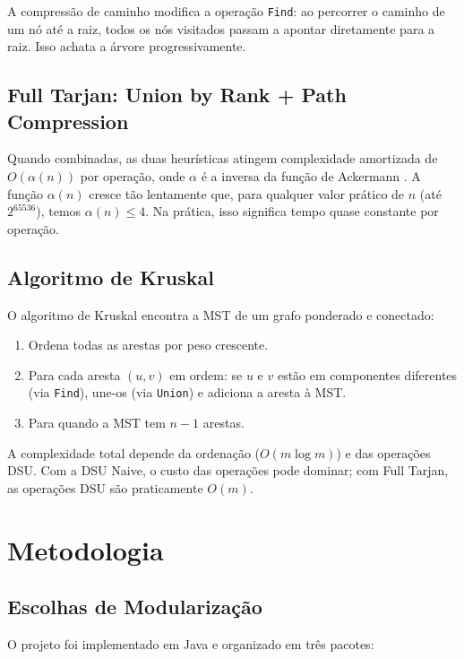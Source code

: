 \documentclass[12pt]{article}
\begin{document}
A compressão de caminho modifica a operação \texttt{Find}: ao percorrer o caminho de um nó até a raiz, todos os nós visitados passam a apontar diretamente para a raiz. Isso achata a árvore progressivamente.

\subsection{Full Tarjan: Union by Rank + Path Compression}

Quando combinadas, as duas heurísticas atingem complexidade amortizada de $O(\alpha(n))$ por operação, onde $\alpha$ é a inversa da função de Ackermann \cite{tarjan1975}. A função $\alpha(n)$ cresce tão lentamente que, para qualquer valor prático de $n$ (até $2^{65536}$), temos $\alpha(n) \leq 4$. Na prática, isso significa tempo quase constante por operação.

\subsection{Algoritmo de Kruskal}

O algoritmo de Kruskal \cite{kruskal1956} encontra a MST de um grafo ponderado e conectado:

\begin{enumerate}
    \item Ordena todas as arestas por peso crescente.
    \item Para cada aresta $(u, v)$ em ordem: se $u$ e $v$ estão em componentes diferentes (via \texttt{Find}), une-os (via \texttt{Union}) e adiciona a aresta à MST.
    \item Para quando a MST tem $n-1$ arestas.
\end{enumerate}

A complexidade total depende da ordenação ($O(m \log m)$) e das operações DSU. Com a DSU Naive, o custo das operações pode dominar; com Full Tarjan, as operações DSU são praticamente $O(m)$.

\section{Metodologia}

\subsection{Escolhas de Modularização}

O projeto foi implementado em Java e organizado em três pacotes:
\end{document}

